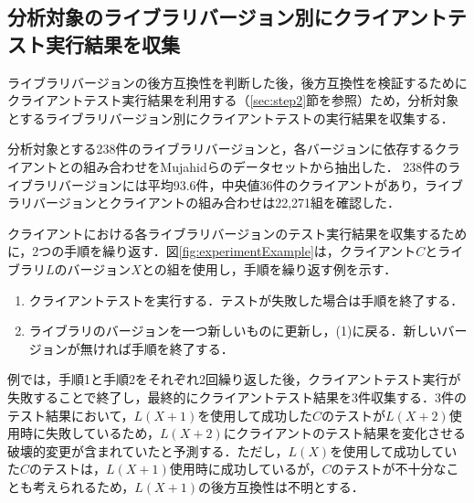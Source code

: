 \documentclass[submit]{ipsj}
\begin{document}


\subsection{分析対象のライブラリバージョン別にクライアントテスト実行結果を収集}
\label{sec:experiment}
ライブラリバージョンの後方互換性を判断した後，後方互換性を検証するためにクライアントテスト実行結果を利用する（\ref{sec:step2}節を参照）ため，分析対象とするライブラリバージョン別にクライアントテストの実行結果を収集する．

分析対象とする238件のライブラリバージョンと，各バージョンに依存するクライアントとの組み合わせをMujahidらのデータセットから抽出した．
238件のライブラリバージョンには平均93.6件，中央値36件のクライアントがあり，ライブラリバージョンとクライアントの組み合わせは22,271組を確認した．

クライアントにおける各ライブラリバージョンのテスト実行結果を収集するために，2つの手順を繰り返す．図\ref{fig:experimentExample}は，クライアント$C$とライブラリ$L$のバージョン$X$との組を使用し，手順を繰り返す例を示す．
\begin{enumerate}
  \item クライアントテストを実行する．テストが失敗した場合は手順を終了する．
  \item ライブラリのバージョンを一つ新しいものに更新し，(1)に戻る．新しいバージョンが無ければ手順を終了する．
\end{enumerate}
例では，手順1と手順2をそれぞれ2回繰り返した後，クライアントテスト実行が失敗することで終了し，最終的にクライアントテスト結果を3件収集する．3件のテスト結果において，$L(X+1)$を使用して成功した$C$のテストが$L(X+2)$使用時に失敗しているため，$L(X+2)$にクライアントのテスト結果を変化させる破壊的変更が含まれていたと予測する．ただし，$L(X)$を使用して成功していた$C$のテストは，$L(X+1)$使用時に成功しているが，$C$のテストが不十分なことも考えられるため，$L(X+1)$の後方互換性は不明とする．





\end{document}
